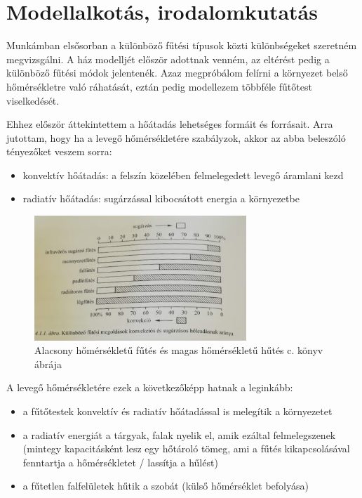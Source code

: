 \section{Modellalkotás, irodalomkutatás}

Munkámban elsősorban a különböző fűtési típusok közti különbségeket szeretném megvizsgálni. A ház modelljét először adottnak venném, az eltérést pedig a különböző fűtési módok jelentenék.
Azaz megpróbálom felírni a környezet belső hőmérsékletre való ráhatását, eztán pedig modellezem többféle fűtőtest viselkedését.

Ehhez először áttekintettem a hőátadás lehetséges formáit és forrásait. Arra jutottam, hogy ha a levegő hőmérsékletére szabályzok, akkor az abba beleszóló tényezőket veszem sorra:
\begin{itemize}[noitemsep,topsep=0pt,parsep=0pt,partopsep=0pt]
	\item konvektív hőátadás: a felszín közelében felmelegedett levegő áramlani kezd
	\item radiatív hőátadás: sugárzással kibocsátott energia a környezetbe
\end{itemize}

\begin{figure}[h]
	\centering
	\includegraphics[width=8cm]{figures/konvrad}
	\caption{Alacsony hőmérsékletű fűtés és magas hőmérsékletű hűtés c. könyv ábrája}
\end{figure}


A levegő hőmérsékletére ezek a következőképp hatnak a leginkább:
\begin{itemize}[noitemsep,topsep=0pt,parsep=0pt,partopsep=0pt]
	\item a fűtőtestek konvektív és radiatív hőátadással is melegítik a környezetet
	\item a radiatív energiát a tárgyak, falak nyelik el, amik ezáltal felmelegszenek (mintegy kapacitásként lesz egy hőtároló tömeg, ami a fűtés kikapcsolásával fenntartja a hőmérsékletet / lassítja a hűlést)
	\item a fűtetlen falfelületek hűtik a szobát (külső hőmérséklet befolyása)
\end{itemize}

